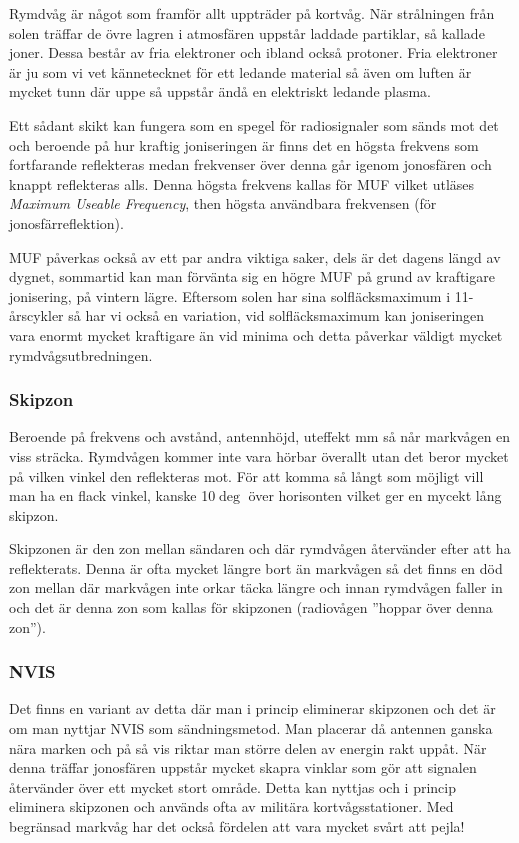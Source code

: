 Rymdvåg är något som framför allt uppträder på kortvåg. När strålningen från
solen träffar de övre lagren i atmosfären uppstår laddade partiklar, så
kallade joner. Dessa består av fria elektroner och ibland också protoner. Fria
elektroner är ju som vi vet kännetecknet för ett ledande material så även om
luften är mycket tunn där uppe så uppstår ändå en elektriskt ledande plasma.

Ett sådant skikt kan fungera som en spegel för radiosignaler som sänds mot det
och beroende på hur kraftig joniseringen är finns det en högsta frekvens som
fortfarande reflekteras medan frekvenser över denna går igenom jonosfären och
knappt reflekteras alls. Denna högsta frekvens kallas för MUF vilket utläses
{\it Maximum Useable Frequency}, then högsta användbara frekvensen (för
jonosfärreflektion).

MUF påverkas också av ett par andra viktiga saker, dels är det dagens längd av
dygnet, sommartid kan man förvänta sig en högre MUF på grund av kraftigare
jonisering, på vintern lägre. Eftersom solen har sina solfläcksmaximum i
11-årscykler så har vi också en variation, vid solfläcksmaximum kan
joniseringen vara enormt mycket kraftigare än vid minima och detta påverkar
väldigt mycket rymdvågsutbredningen.

\subsubsection{Skipzon}

Beroende på frekvens och avstånd, antennhöjd, uteffekt mm så når markvågen en
viss sträcka. Rymdvågen kommer inte vara hörbar överallt utan det beror mycket
på vilken vinkel den reflekteras mot. För att komma så långt som möjligt vill
man ha en flack vinkel, kanske 10$\deg$ över horisonten vilket ger en mycekt
lång skipzon.

Skipzonen är den zon mellan sändaren och där rymdvågen återvänder efter att ha
reflekterats. Denna är ofta mycket längre bort än markvågen så det finns en
död zon mellan där markvågen inte orkar täcka längre och innan rymdvågen
faller in och det är denna zon som kallas för skipzonen (radiovågen ''hoppar
över denna zon'').

\subsubsection{NVIS}

Det finns en variant av detta där man i princip eliminerar skipzonen och det
är om man nyttjar NVIS som sändningsmetod. Man placerar då antennen ganska
nära marken och på så vis riktar man större delen av energin rakt uppåt. När
denna träffar jonosfären uppstår mycket skapra vinklar som gör att signalen
återvänder över ett mycket stort område. Detta kan nyttjas och i princip
eliminera skipzonen och används ofta av militära kortvågsstationer. Med
begränsad markvåg har det också fördelen att vara mycket svårt att pejla!

